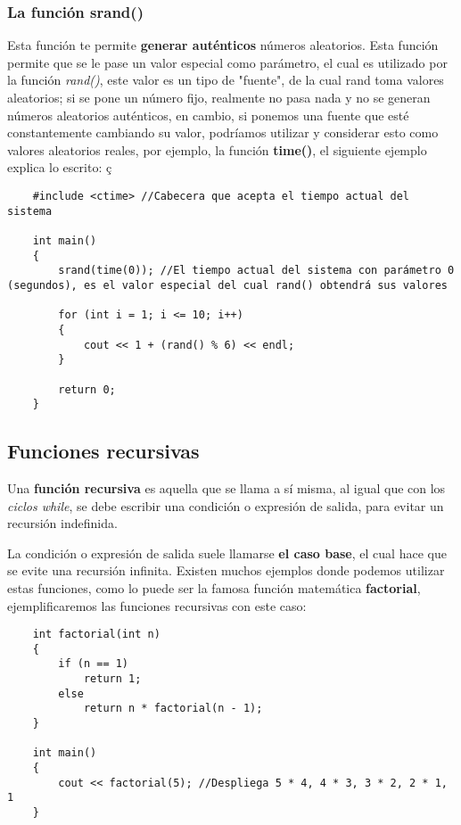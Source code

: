 \subsubsection{La función srand()}
\hspace{0.55cm}Esta función te permite \textbf{generar auténticos} números aleatorios. Esta función permite que se le pase un valor especial como parámetro, el cual es utilizado por la función \textit{rand()}, este valor es un tipo de "fuente", de la cual rand toma valores aleatorios; si se pone un número fijo, realmente no pasa nada y no se generan números aleatorios auténticos, en cambio, si ponemos una fuente que esté constantemente cambiando su valor, podríamos utilizar y considerar esto como valores aleatorios reales, por ejemplo, la función \textbf{time()}, el siguiente ejemplo explica lo escrito:
ç\begin{lstlisting}
    #include <ctime> //Cabecera que acepta el tiempo actual del sistema

    int main()
    {
        srand(time(0)); //El tiempo actual del sistema con parámetro 0 (segundos), es el valor especial del cual rand() obtendrá sus valores
        
        for (int i = 1; i <= 10; i++)
        {
            cout << 1 + (rand() % 6) << endl;
        }
        
        return 0;
    }
\end{lstlisting}


\subsection{Funciones recursivas}
\hspace{0.55cm}Una \textbf{función recursiva} es aquella que se llama a sí misma, al igual que con los \textit{ciclos while}, se debe escribir una condición o expresión de salida, para evitar un recursión indefinida.

La condición o expresión de salida suele llamarse \textbf{el caso base}, el cual hace que se evite una recursión infinita. Existen muchos ejemplos donde podemos utilizar estas funciones, como lo puede ser la famosa función matemática \textbf{factorial}, ejemplificaremos las funciones recursivas con este caso:
\begin{lstlisting}
    int factorial(int n)
    {
        if (n == 1)
            return 1;
        else
            return n * factorial(n - 1);
    }
    
    int main()
    {
        cout << factorial(5); //Despliega 5 * 4, 4 * 3, 3 * 2, 2 * 1, 1
    }
\end{lstlisting}